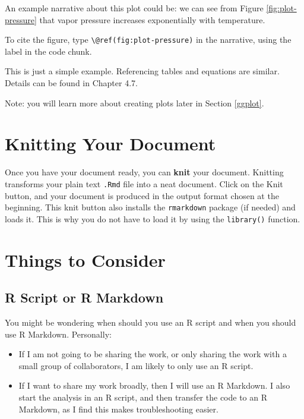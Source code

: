 \documentclass[
]{book}
\providecommand{\tightlist}{%
  \setlength{\itemsep}{0pt}\setlength{\parskip}{0pt}}
\theoremstyle{definition}
\theoremstyle{definition}
\theoremstyle{definition}
\theoremstyle{definition}
\theoremstyle{remark}
\begin{document}
An example narrative about this plot could be: we can see from Figure \ref{fig:plot-pressure} that vapor pressure increases exponentially with temperature.

To cite the figure, type \texttt{\textbackslash{}@ref(fig:plot-pressure)} in the narrative, using the label in the code chunk.

This is just a simple example. Referencing tables and equations are similar. Details can be found in \citet{xie2020} Chapter 4.7.

Note: you will learn more about creating plots later in Section \ref{ggplot}.

\hypertarget{knitting-your-document}{%
\section{Knitting Your Document}\label{knitting-your-document}}

Once you have your document ready, you can \textbf{knit} your document. Knitting transforms your plain text \texttt{.Rmd} file into a neat document. Click on the Knit button, and your document is produced in the output format chosen at the beginning. This knit button also installs the \texttt{rmarkdown} package (if needed) and loads it. This is why you do not have to load it by using the \texttt{library()} function.

\hypertarget{things-to-consider}{%
\section{Things to Consider}\label{things-to-consider}}

\hypertarget{r-script-or-r-markdown}{%
\subsection{R Script or R Markdown}\label{r-script-or-r-markdown}}

You might be wondering when should you use an R script and when you should use R Markdown. Personally:

\begin{itemize}
\tightlist
\item
  If I am not going to be sharing the work, or only sharing the work with a small group of collaborators, I am likely to only use an R script.
\item
  If I want to share my work broadly, then I will use an R Markdown. I also start the analysis in an R script, and then transfer the code to an R Markdown, as I find this makes troubleshooting easier.
\end{itemize}
\end{document}
